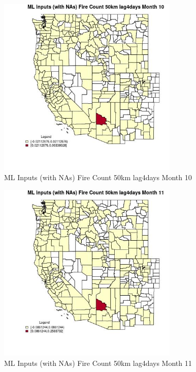 \begin{figure} 
\centering  
\includegraphics[width=0.77\textwidth]{Code_Outputs/Report_ML_input_PM25_Step4_part_e_de_duplicated_aves_compiled_2019-05-21wNAs_CountyFire_Count_50km_lag4daysmedianMonth10.jpg} 
\caption{\label{fig:Report_ML_input_PM25_Step4_part_e_de_duplicated_aves_compiled_2019-05-21wNAsCountyFire_Count_50km_lag4daysmedianMonth10}ML Inputs (with NAs) Fire Count 50km lag4days Month 10} 
\end{figure} 
 

\begin{figure} 
\centering  
\includegraphics[width=0.77\textwidth]{Code_Outputs/Report_ML_input_PM25_Step4_part_e_de_duplicated_aves_compiled_2019-05-21wNAs_CountyFire_Count_50km_lag4daysmedianMonth11.jpg} 
\caption{\label{fig:Report_ML_input_PM25_Step4_part_e_de_duplicated_aves_compiled_2019-05-21wNAsCountyFire_Count_50km_lag4daysmedianMonth11}ML Inputs (with NAs) Fire Count 50km lag4days Month 11} 
\end{figure} 
 

